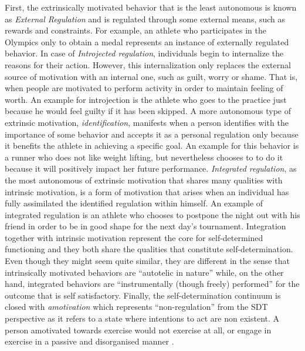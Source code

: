First, the extrinsically motivated behavior that is the least autonomous is known as \textit{External Regulation} and is regulated through some external means, such as rewards and constraints. For example, an athlete who participates in the Olympics only to obtain a medal represents an instance of externally regulated behavior. In case of \textit{Introjected regulation}, individuals begin to internalize the reasons for their action. However, this internalization only replaces the external source of motivation with an internal one, such as guilt, worry or shame. That is, when people are motivated to perform activity in order to maintain feeling of worth. An example for introjection is the athlete who goes to the practice just because he would feel guilty if it has been skipped. A more autonomous type of extrinsic motivation, \textit{identification}, manifests when a person identifies with the importance of some behavior and accepts it as a personal regulation only because it benefits the athlete in achieving a specific goal. An example for this behavior is a runner who does not like weight lifting, but nevertheless chooses to to do it because it will positively impact her future performance. \textit{Integrated regulation}, as the most autonomous of extrinsic motivation that shares many qualities with intrinsic motivation, is a form of motivation that arises when an individual has fully assimilated the identified regulation within himself. An example of integrated regulation is an athlete who chooses to postpone the night out with his friend in order to be in good shape for the next day's tournament. Integration together with intrinsic motivation represent the core for self-determined functioning and they both share the qualities that constitute self-determination. Even though they might seem quite similar, they are different in the sense that intrinsically motivated behaviors are ``autotelic in nature'' while, on the other hand, integrated behaviors are ``instrumentally (though freely) performed'' for the outcome that is self satisfactory.  Finally, the self-determination continuum is closed with  \textit{amotivation} which represents ``non-regulation'' from the SDT perspective as it refers to a state where intentions to act are non existent. A person amotivated towards exercise would not exercise at all, 
or engage in exercise in a passive and disorganised  manner \cite{vallerand2007intrinsic, ryan2000intrinsic, deci1994promoting}.


